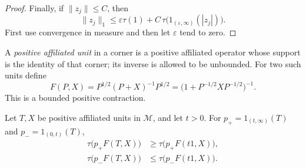 \begin{proof}
Finally, if \(\|z_j\|\le C\), then
\[
 \|z_j\|_1
 \le \varepsilon\tau(1)
       +C\,\tau\bigl(1_{(\varepsilon,\infty)}(|z_j|)\bigr).
\]
First use convergence in measure and then let \(\varepsilon\) tend to
zero.
\end{proof}

A \emph{positive affiliated unit} in a corner is a positive affiliated
operator whose support is the identity of that corner; its inverse is
allowed to be unbounded.  For two such units define
\begin{equation}\label{coeff:analytic-F}
 F(P,X)=P^{1/2}(P+X)^{-1}P^{1/2}
       =\bigl(1+P^{-1/2}XP^{-1/2}\bigr)^{-1}.
\end{equation}
This is a bounded positive contraction.

\begin{lemma}
\label{coeff:analytic-projection}
Let \(T,X\) be positive affiliated units in \(\mathcal M\), and let
\(t>0\).  For \(p_+=1_{(t,\infty)}(T)\) and
\(p_-=1_{(0,t)}(T)\),
\begin{align}
 \tau\bigl(p_+F(T,X)\bigr)
     &\ge \tau\bigl(p_+F(t1,X)\bigr), \label{coeff:analytic-high}\\
 \tau\bigl(p_-F(T,X)\bigr)
     &\le \tau\bigl(p_-F(t1,X)\bigr). \label{coeff:analytic-low}
\end{align}
\end{lemma}

